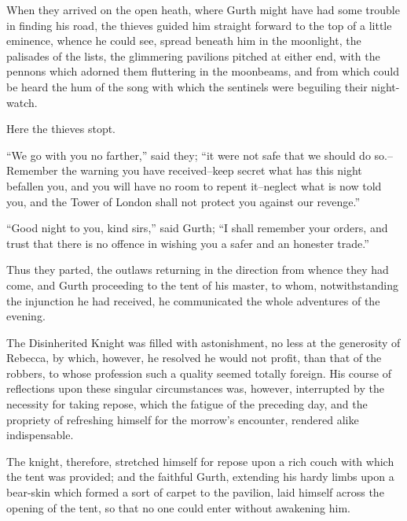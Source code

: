 When they arrived on the open heath, where Gurth might have had some
trouble in finding his road, the thieves guided him straight forward to
the top of a little eminence, whence he could see, spread beneath him in
the moonlight, the palisades of the lists, the glimmering pavilions
pitched at either end, with the pennons which adorned them fluttering in
the moonbeams, and from which could be heard the hum of the song with
which the sentinels were beguiling their night-watch.

Here the thieves stopt.

``We go with you no farther,'' said they; ``it were not safe that we
should do so.--Remember the warning you have received--keep secret what
has this night befallen you, and you will have no room to repent
it--neglect what is now told you, and the Tower of London shall not
protect you against our revenge.''

``Good night to you, kind sirs,'' said Gurth; ``I shall remember your
orders, and trust that there is no offence in wishing you a safer and an
honester trade.''

Thus they parted, the outlaws returning in the direction from whence
they had come, and Gurth proceeding to the tent of his master, to whom,
notwithstanding the injunction he had received, he communicated the
whole adventures of the evening.

The Disinherited Knight was filled with astonishment, no less at the
generosity of Rebecca, by which, however, he resolved he would not
profit, than that of the robbers, to whose profession such a quality
seemed totally foreign. His course of reflections upon these singular
circumstances was, however, interrupted by the necessity for taking
repose, which the fatigue of the preceding day, and the propriety of
refreshing himself for the morrow's encounter, rendered alike
indispensable.

The knight, therefore, stretched himself for repose upon a rich couch
with which the tent was provided; and the faithful Gurth, extending his
hardy limbs upon a bear-skin which formed a sort of carpet to the
pavilion, laid himself across the opening of the tent, so that no one
could enter without awakening him.
